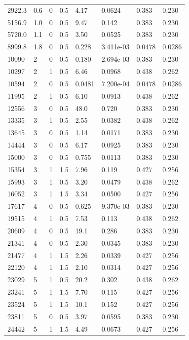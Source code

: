 \documentclass[preview]{standalone}
\begin{document}
{{\begin{tabular}{L{1.2cm}C{1.2cm} C{0.3cm}C{0.5cm} C{1.4cm}C{1.4cm} C{1.4cm}C{1.4cm}}
  2922.3  &   0.6  & 0     & 0.5 &  4.17  & 0.0624  & 0.383 &  0.230   \\ 
  5156.9  &   1.0  & 0     & 0.5 &  9.47  & 0.142  & 0.383 &  0.230   \\ 
  5720.0  &   1.1  & 0     & 0.5 &  3.50  & 0.0525  & 0.383 &  0.230   \\ 
  8999.8  &   1.8  & 0     & 0.5 &  0.228  & 3.411e-03  & 0.0478 &  0.0286   \\ 
  10090  &     2  & 0     & 0.5 &  0.180  & 2.694e-03  & 0.383 &  0.230   \\ 
  10297  &     2  & 1     & 0.5 &  6.46  & 0.0968  & 0.438 &  0.262   \\ 
  10594  &     2  & 0     & 0.5 &  0.0481  & 7.200e-04  & 0.0478 &  0.0286   \\ 
  11995  &     2  & 1     & 0.5 &  6.10  & 0.0913  & 0.438 &  0.262   \\ 
  12556  &     3  & 0     & 0.5 &  48.0  & 0.720  & 0.383 &  0.230   \\ 
  13335  &     3  & 1     & 0.5 &  2.55  & 0.0382  & 0.438 &  0.262   \\ 
  13645  &     3  & 0     & 0.5 &  1.14  & 0.0171  & 0.383 &  0.230   \\ 
  14444  &     3  & 0     & 0.5 &  6.17  & 0.0925  & 0.383 &  0.230   \\ 
  15000  &     3  & 0     & 0.5 &  0.755  & 0.0113  & 0.383 &  0.230   \\ 
  15354  &     3  & 1     & 1.5 &  7.96  & 0.119  & 0.427 &  0.256   \\ 
  15993  &     3  & 1     & 0.5 &  3.20  & 0.0479  & 0.438 &  0.262   \\ 
  16052  &     3  & 1     & 1.5 &  3.34  & 0.0500  & 0.427 &  0.256   \\ 
  17617  &     4  & 0     & 0.5 &  0.625  & 9.370e-03  & 0.383 &  0.230   \\ 
  19515  &     4  & 1     & 0.5 &  7.53  & 0.113  & 0.438 &  0.262   \\ 
  20609  &     4  & 0     & 0.5 &  19.1  & 0.286  & 0.383 &  0.230   \\ 
  21341  &     4  & 0     & 0.5 &  2.30  & 0.0345  & 0.383 &  0.230   \\ 
  21477  &     4  & 1     & 1.5 &  2.26  & 0.0339  & 0.427 &  0.256   \\ 
  22120  &     4  & 1     & 1.5 &  2.10  & 0.0314  & 0.427 &  0.256   \\ 
  23029  &     5  & 1     & 0.5 &  20.2  & 0.302  & 0.438 &  0.262   \\ 
  23241  &     5  & 1     & 1.5 &  7.70  & 0.115  & 0.427 &  0.256   \\ 
  23524  &     5  & 1     & 1.5 &  10.1  & 0.152  & 0.427 &  0.256   \\ 
  23811  &     5  & 0     & 0.5 &  3.97  & 0.0595  & 0.383 &  0.230   \\ 
  24442  &     5  & 1     & 1.5 &  4.49  & 0.0673  & 0.427 &  0.256   \\ 
\hline 
\end{tabular} 

}}
\end{document}

